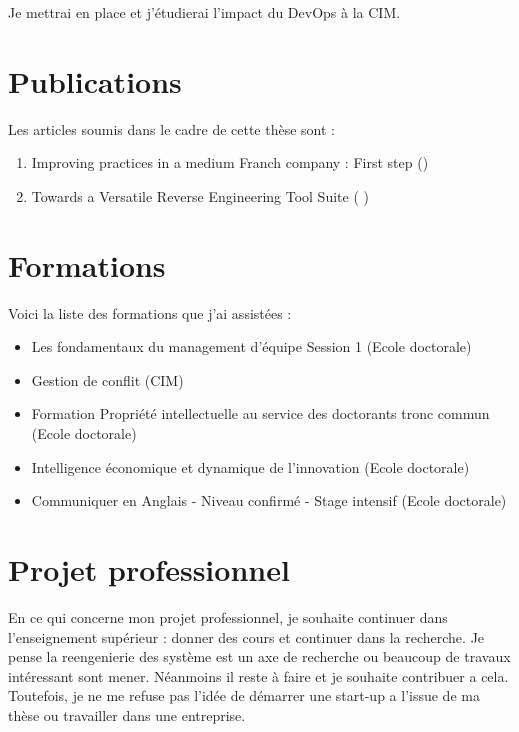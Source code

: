 \documentclass[a4paper]{article}
\begin{document}
Je mettrai en place et j'étudierai l'impact du DevOps à la CIM. 

\section{Publications}

Les articles soumis dans le cadre de cette thèse sont :
\begin{enumerate}
\item Improving practices in a medium Franch company : First step (\citet{Houe20a})
\item Towards a Versatile Reverse Engineering Tool Suite ( \citet{Houe20b})

\end{enumerate}

\section{Formations}
Voici la liste des formations que j'ai assistées :
\begin{itemize}
\item Les fondamentaux du management d’équipe Session 1 (Ecole doctorale)
\item Gestion de conflit (CIM) 
\item Formation Propriété intellectuelle au service des doctorants tronc commun (Ecole doctorale)
\item Intelligence économique et dynamique de l'innovation (Ecole doctorale)
\item Communiquer en Anglais - Niveau confirmé - Stage intensif (Ecole doctorale)
\end{itemize}

\section{Projet professionnel}
En ce qui concerne mon projet professionnel, je souhaite continuer dans l'enseignement supérieur : donner des cours et continuer dans la recherche.
Je pense la reengenierie des système est un axe de recherche ou beaucoup de travaux intéressant sont mener. Néanmoins il reste à faire et je souhaite contribuer a cela.
Toutefois, je ne me refuse pas l'idée de démarrer une start-up a l'issue de ma thèse ou travailler dans une entreprise.

\footnotesize{
 

}
\end{document}
